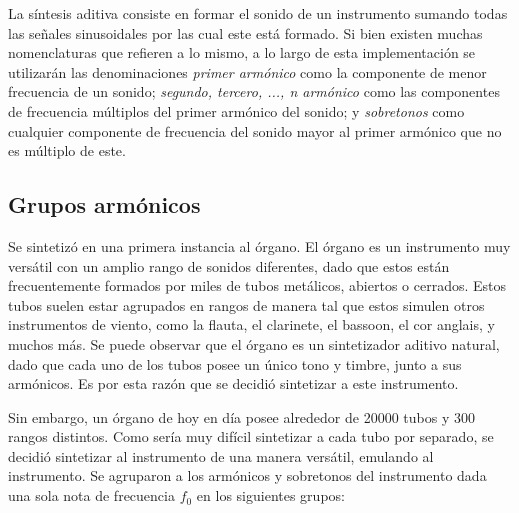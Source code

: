 La síntesis aditiva consiste en formar el sonido de un instrumento sumando todas las señales sinusoidales por las cual este está formado. Si bien existen muchas nomenclaturas que refieren a lo mismo, a lo largo de esta implementación se utilizarán las denominaciones \textit{primer armónico} como la componente de menor frecuencia de un sonido; \textit{segundo, tercero, ..., n armónico} como las componentes de frecuencia múltiplos del primer armónico del sonido; y \textit{sobretonos} como cualquier componente de frecuencia del sonido mayor al primer armónico que no es múltiplo de este.

\subsection{Grupos armónicos}

Se sintetizó en una primera instancia al órgano. El órgano es un instrumento muy versátil con un amplio rango de sonidos diferentes, dado que estos están frecuentemente formados por miles de tubos metálicos, abiertos o cerrados. Estos tubos suelen estar agrupados en rangos de manera tal que estos simulen otros instrumentos de viento, como la flauta, el clarinete, el bassoon, el cor anglais, y muchos más. Se puede observar que el órgano es un sintetizador aditivo natural, dado que cada uno de los tubos posee un único tono y timbre, junto a sus armónicos. Es por esta razón que se decidió sintetizar a este instrumento. 

Sin embargo, un órgano de hoy en día posee alrededor de 20000 tubos y 300 rangos distintos. Como sería muy difícil sintetizar a cada tubo por separado, se decidió sintetizar al instrumento de una manera versátil, emulando al instrumento. Se agruparon a los armónicos y sobretonos del instrumento dada una sola nota de frecuencia $f_0$ en los siguientes grupos:

